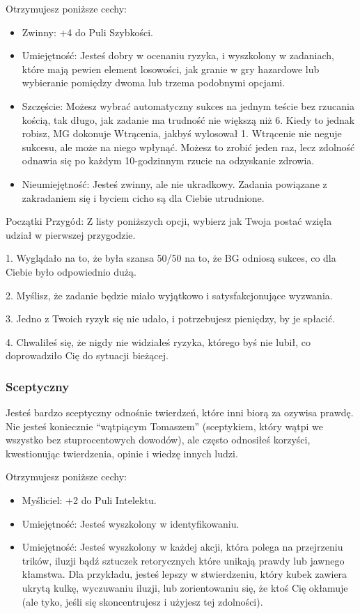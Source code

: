 Otrzymujesz poniższe cechy:
\begin{itemize}
    \item Zwinny: +4 do Puli Szybkości.
    \item Umiejętność: Jesteś dobry w ocenaniu ryzyka, i wyszkolony w zadaniach, które mają pewien element losowości, jak granie w gry hazardowe lub wybieranie pomiędzy dwoma lub trzema podobnymi opcjami.
    \item Szczęście: Możesz wybrać automatyczny sukces na jednym teście bez rzucania kością, tak długo, jak zadanie ma trudność nie większą niż 6. Kiedy to jednak robisz, MG dokonuje Wtrącenia, jakbyś wylosował 1. Wtrącenie nie neguje sukcesu, ale może na niego wpłynąć. Możesz to zrobić jeden raz, lecz zdolność odnawia się po każdym 10-godzinnym rzucie na odzyskanie zdrowia.
    \item Nieumiejętność: Jesteś zwinny, ale nie ukradkowy. Zadania powiązane z zakradaniem się i byciem cicho są dla Ciebie utrudnione.
\end{itemize}

Początki Przygód: Z listy poniższych opcji, wybierz jak Twoja postać wzięła udział w pierwszej przygodzie.

1. Wyglądało na to, że była szansa 50/50 na to, że BG odniosą sukces, co dla Ciebie było odpowiednio dużą.

2. Myślisz, że zadanie będzie miało wyjątkowo i satysfakcjonujące wyzwania.

3. Jedno z Twoich ryzyk się nie udało, i potrzebujesz pieniędzy, by je spłacić.

4. Chwaliłeś się, że nigdy nie widziałeś ryzyka, którego byś nie lubił, co doprowadziło Cię do sytuacji bieżącej. 

\subsubsection{Sceptyczny}

Jesteś bardzo sceptyczny odnośnie twierdzeń, które inni biorą za ozywisa prawdę. Nie jesteś koniecznie “wątpiącym Tomaszem” (sceptykiem, który wątpi we wszystko bez stuprocentowych dowodów), ale często odnosiłeś korzyści, kwestionując twierdzenia, opinie i wiedzę innych ludzi.

Otrzymujesz poniższe cechy:
\begin{itemize}
    \item Myśliciel: +2 do Puli Intelektu.
    \item  Umiejętność: Jesteś wyszkolony w identyfikowaniu.
    \item  Umiejętność: Jesteś wyszkolony w każdej akcji, która polega na przejrzeniu trików, iluzji bądź sztuczek retorycznych które unikają prawdy lub jawnego kłamstwa. Dla przykładu, jesteś lepszy w stwierdzeniu, który kubek zawiera ukrytą kulkę, wyczuwaniu iluzji, lub zorientowaniu się, że ktoś Cię okłamuje (ale tyko, jeśli się skoncentrujesz i użyjesz tej zdolności).
\end{itemize}    

